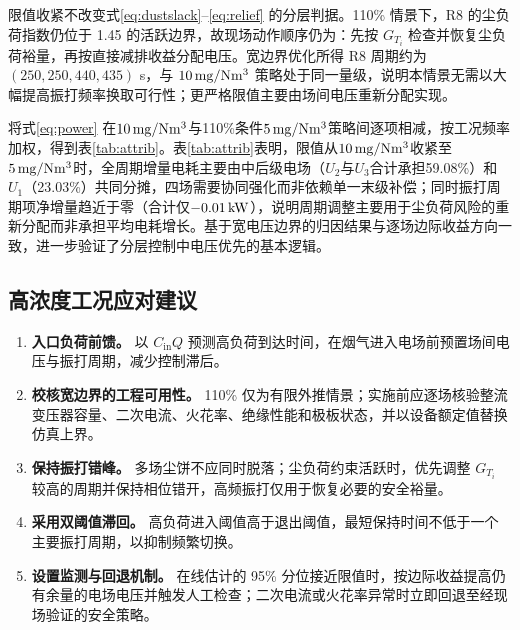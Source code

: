 限值收紧不改变式\eqref{eq:dustslack}--\eqref{eq:relief} 的分层判据。110\% 情景下，R8 的尘负荷指数仍位于 1.45 的活跃边界，故现场动作顺序仍为：先按 $G_{T_i}$ 检查并恢复尘负荷裕量，再按直接减排收益分配电压。宽边界优化所得 R8 周期约为 $(250,250,440,435)$ s，与 $10\,\mathrm{mg/Nm^3}$ 策略处于同一量级，说明本情景无需以大幅提高振打频率换取可行性；更严格限值主要由场间电压重新分配实现。

将式\eqref{eq:power} 在$10\,\mathrm{mg/Nm^3}$与110\%条件$5\,\mathrm{mg/Nm^3}$策略间逐项相减，按工况频率加权，得到表\ref{tab:attrib}。表\ref{tab:attrib}表明，限值从$10\,\mathrm{mg/Nm^3}$收紧至$5\,\mathrm{mg/Nm^3}$时，全周期增量电耗主要由中后级电场（$U_2$与$U_3$合计承担59.08\%）和$U_1$（23.03\%）共同分摊，四场需要协同强化而非依赖单一末级补偿；同时振打周期项净增量趋近于零（合计仅$-0.01\,\mathrm{kW}$），说明周期调整主要用于尘负荷风险的重新分配而非承担平均电耗增长。基于宽电压边界的归因结果与逐场边际收益方向一致，进一步验证了分层控制中电压优先的基本逻辑。

\begin{table}[H]
\centering
\caption{110\% 宽边界下全周期增量功率的分项归因}
\label{tab:attrib}
\end{table}

\subsection{高浓度工况应对建议}

\begin{enumerate}
  \item \textbf{入口负荷前馈。} 以 $C_{\mathrm{in}}Q$ 预测高负荷到达时间，在烟气进入电场前预置场间电压与振打周期，减少控制滞后。
  \item \textbf{校核宽边界的工程可用性。} 110\% 仅为有限外推情景；实施前应逐场核验整流变压器容量、二次电流、火花率、绝缘性能和极板状态，并以设备额定值替换仿真上界。
  \item \textbf{保持振打错峰。} 多场尘饼不应同时脱落；尘负荷约束活跃时，优先调整 $G_{T_i}$ 较高的周期并保持相位错开，高频振打仅用于恢复必要的安全裕量。
  \item \textbf{采用双阈值滞回。} 高负荷进入阈值高于退出阈值，最短保持时间不低于一个主要振打周期，以抑制频繁切换。
  \item \textbf{设置监测与回退机制。} 在线估计的 95\% 分位接近限值时，按边际收益提高仍有余量的电场电压并触发人工检查；二次电流或火花率异常时立即回退至经现场验证的安全策略。
\end{enumerate}

